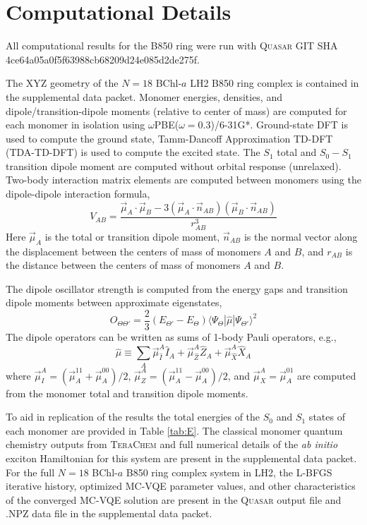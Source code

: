 \section{Computational Details}

All computational results for the B850 ring were run with \textsc{Quasar} GIT
SHA 4ce64a05a0f5f63988cb68209d24e085d2de275f.

The XYZ geometry of the $N=18$ BChl-$a$ LH2 B850 ring complex is contained in
the supplemental data packet. Monomer energies, densities, and
dipole/transition-dipole moments (relative to center of mass) are computed for
each monomer in isolation using $\omega$PBE($\omega=0.3$)/6-31G*. Ground-state
DFT is used to compute the ground state, Tamm-Dancoff Approximation TD-DFT
(TDA-TD-DFT) is used to compute the excited state. The $S_1$ total and $S_0-S_1$
transition dipole moment are computed without orbital response (unrelaxed).
Two-body interaction matrix elements are computed between monomers using the
dipole-dipole interaction formula,
\begin{equation}
V_{AB}
=
\frac{
\vec \mu_{A} \cdot \vec \mu_{B}
-
3
(\vec \mu_A{} \cdot \vec n_{AB})
(\vec \mu_B{} \cdot \vec n_{AB})
}{r_{AB}^3}
\end{equation}
Here $\vec \mu_{A}$ is the total or transition dipole moment, $\vec n_{AB}$ is
the normal vector along the displacement between the centers of mass of monomers
$A$ and $B$, and $r_{AB}$ is the distance between the centers of mass of
monomers $A$ and $B$.

The dipole oscillator strength is computed from the energy gaps and transition
dipole moments between approximate eigenstates,
\begin{equation}
O_{\Theta \Theta'}
=
\frac{2}{3}
(E_{\Theta'} - E_{\Theta})
\langle
\Psi_{\Theta} |
\hat \mu
| \Psi_{\Theta'}
\rangle^2
\end{equation}
The dipole operators can be written as sums of 1-body Pauli operators, e.g.,
\begin{equation}
\hat \mu
\equiv
\sum_{A}
\vec \mu_{\hat I}^A
\hat I_{A}
+
\vec \mu_{\hat Z}^A
\hat Z_{A}
+
\vec \mu_{\hat X}^A
\hat X_{A}
\end{equation}
where $\vec \mu_{I}^A = (\vec \mu_{A}^{11} + \vec \mu_{A}^{00}) / 2$, $\vec
\mu_{Z}^A = (\vec \mu_{A}^{11}
- \vec \mu_{A}^{00}) / 2$, and $\vec \mu_{X}^{A} = \vec \mu_{A}^{01}$ are
  computed from the monomer total and transition dipole moments.

To aid in replication of the results the total energies of the $S_0$ and $S_1$
states of each monomer are provided in Table \ref{tab:E}. The classical monomer
quantum chemistry outputs from \textsc{TeraChem} and full numerical details of
the \emph{ab initio} exciton Hamiltonian for this system are present in the
supplemental data packet. For the full $N=18$ BChl-$a$ B850 ring complex system
in LH2, the L-BFGS iterative history, optimized MC-VQE parameter values, and
other characteristics of the converged MC-VQE solution are present in the
\textsc{Quasar} output file and \textsc{.NPZ} data file in the supplemental data
packet.

